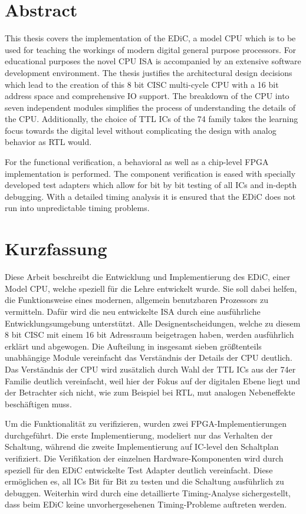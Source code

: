 \chapter*{Abstract}
This thesis covers the implementation of the \gls{EDiC}, a model \gls{CPU} which is to be used for teaching the workings of modern digital general purpose processors.
For educational purposes the novel \gls{CPU} \gls{ISA} is accompanied by an extensive software development environment.
The thesis justifies the architectural design decisions which lead to the creation of this 8 bit \gls{CISC} multi-cycle \gls{CPU} with a 16 bit address space and comprehensive \gls{IO} support.
The breakdown of the \gls{CPU} into seven independent modules simplifies the process of understanding the details of the \gls{CPU}.
Additionally, the choice of \gls{TTL} \glspl{IC} of the 74 family takes the learning focus towards the digital level without complicating the design with analog behavior as \gls{RTL} would.

For the functional verification, a behavioral as well as a chip-level \gls{FPGA} implementation is performed.
The component verification is eased with specially developed test adapters which allow for bit by bit testing of all \glspl{IC} and in-depth debugging.
With a detailed timing analysis it is ensured that the \gls{EDiC} does not run into unpredictable timing problems.
\begingroup
\renewcommand{\cleardoublepage}{}
\clearpage
\chapter*{Kurzfassung}
\endgroup
\glsresetall
Diese Arbeit beschreibt die Entwicklung und Implementierung des \gls{EDiC}, einer Model \gls{CPU}, welche speziell für die Lehre entwickelt wurde.
Sie soll dabei helfen, die Funktionsweise eines modernen, allgemein benutzbaren Prozessors zu vermitteln.
Dafür wird die neu entwickelte \gls{ISA} durch eine ausführliche Entwicklungsumgebung unterstützt.
Alle Designentscheidungen, welche zu diesem 8 bit \gls{CISC} mit einem 16 bit Adressraum beigetragen haben, werden ausführlich erklärt und abgewogen.
Die Aufteilung in insgesamt sieben größtenteils unabhängige Module vereinfacht das Verständnis der Details der \gls{CPU} deutlich.
Das Verständnis der \gls{CPU} wird zusätzlich durch Wahl der \gls{TTL} \glspl{IC} aus der 74er Familie deutlich vereinfacht, weil hier der Fokus auf der digitalen Ebene liegt und der Betrachter sich nicht, wie zum Beispiel bei \gls{RTL}, mut analogen Nebeneffekte beschäftigen muss.

Um die Funktionalität zu verifizieren, wurden zwei \gls{FPGA}-Implementierungen durchgeführt.
Die erste Implementierung, modeliert nur das Verhalten der Schaltung, während die zweite Implementierung auf \gls{IC}-level den Schaltplan verifiziert.
Die Verifikation der einzelnen Hardware-Komponenten wird durch speziell für den \gls{EDiC} entwickelte Test Adapter deutlich vereinfacht.
Diese ermöglichen es, all \glspl{IC} Bit für Bit zu testen und die Schaltung ausführlich zu debuggen.
Weiterhin wird durch eine detaillierte Timing-Analyse sichergestellt, dass beim \gls{EDiC} keine unvorhergesehenen Timing-Probleme auftreten werden.